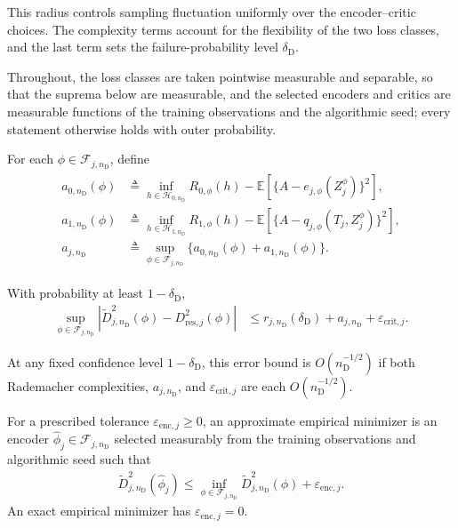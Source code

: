 This radius controls sampling fluctuation uniformly over the encoder--critic choices. The complexity terms account for the flexibility of the two loss classes, and the last term sets the failure-probability level $\delta_{\mathrm D}$.

Throughout, the loss classes are taken pointwise measurable and separable, so that the suprema below are measurable, and the selected encoders and critics are measurable functions of the training observations and the algorithmic seed; every statement otherwise holds with outer probability.

\begin{proposition}
\label{appdetail:prop:uniform-discrepancy-deviation}
\normalfont
For each $\phi\in\mathcal F_{j,n_{\mathrm D}}$, define
\begin{align}
\begin{aligned}
	a_{0,n_{\mathrm D}}(\phi)
	&\triangleq
	\inf_{h\in\mathcal H_{0,n_{\mathrm D}}}R_{0,\phi}(h)
	-
	\mathbb E[\{A-e_{j,\phi}(Z_j^\phi)\}^2],\\
	a_{1,n_{\mathrm D}}(\phi)
	&\triangleq
	\inf_{h\in\mathcal H_{1,n_{\mathrm D}}}R_{1,\phi}(h)
	-
	\mathbb E[\{A-q_{j,\phi}(T_j,Z_j^\phi)\}^2],\\
	a_{j,n_{\mathrm D}}
	&\triangleq
	\sup_{\phi\in\mathcal F_{j,n_{\mathrm D}}}
	\{a_{0,n_{\mathrm D}}(\phi)+a_{1,n_{\mathrm D}}(\phi)\}.
\end{aligned}
\label{eq:critic-approximation-error}
\end{align}

With probability at least $1-\delta_{\mathrm D}$,
\begin{align}
\sup_{\phi\in\mathcal F_{j,n_{\mathrm D}}} |\widetilde D_{j,n_{\mathrm D}}^2(\phi)-D_{\mathrm{res},j}^2(\phi)| &\le r_{j,n_{\mathrm D}}(\delta_{\mathrm D})+a_{j,n_{\mathrm D}}+\varepsilon_{\mathrm{crit},j}.
\label{eq:uniform-discrepancy-deviation}
\end{align}
\end{proposition}
At any fixed confidence level $1-\delta_{\mathrm D}$, this error bound is $O(n_{\mathrm D}^{-1/2})$ if both Rademacher complexities, $a_{j,n_{\mathrm D}}$, and $\varepsilon_{\mathrm{crit},j}$ are each $O(n_{\mathrm D}^{-1/2})$.

\begin{definition}
\label{def:approximate-empirical-minimizer}
\normalfont
 For a prescribed tolerance $\varepsilon_{\mathrm{enc},j}\ge0$, an approximate empirical minimizer is an encoder $\widehat\phi_j\in\mathcal F_{j,n_{\mathrm D}}$ selected measurably from the training observations and algorithmic seed such that
\begin{align}
\widetilde D_{j,n_{\mathrm D}}^2(\widehat\phi_j)
\le
\inf_{\phi\in\mathcal F_{j,n_{\mathrm D}}}\widetilde D_{j,n_{\mathrm D}}^2(\phi)
+
\varepsilon_{\mathrm{enc},j}.
\label{eq:approximate-erm}
\end{align}
An exact empirical minimizer has $\varepsilon_{\mathrm{enc},j}=0$.

\end{definition}

